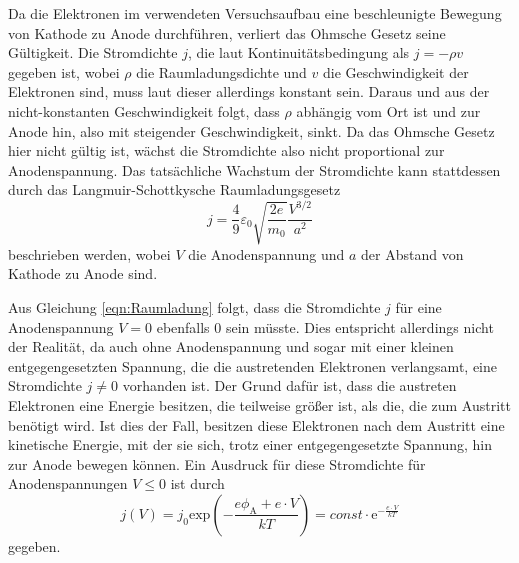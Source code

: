 
Da die Elektronen im verwendeten Versuchsaufbau eine beschleunigte Bewegung von Kathode zu Anode durchführen, verliert das Ohmsche Gesetz seine Gültigkeit. Die Stromdichte $j$,
die laut Kontinuitätsbedingung als $j = - \rho v$ gegeben ist, wobei $\rho$ die Raumladungsdichte und $v$ die Geschwindigkeit der Elektronen sind, muss laut dieser allerdings
konstant sein. Daraus und aus der nicht-konstanten Geschwindigkeit folgt, dass $\rho$ abhängig vom Ort ist und zur Anode hin, also mit steigender Geschwindigkeit, sinkt.
\newline
Da das Ohmsche Gesetz hier nicht gültig ist, wächst die Stromdichte also nicht proportional zur Anodenspannung. Das tatsächliche Wachstum der Stromdichte kann stattdessen
durch das Langmuir-Schottkysche Raumladungsgesetz 
\begin{equation}
    j = \frac{4}{9}\varepsilon_0 \sqrt{\frac{2e}{m_0}}\frac{V^{3/2}}{a^2}
    \label{eqn:Raumladung}
\end{equation}
beschrieben werden, wobei $V$ die Anodenspannung und $a$ der Abstand von Kathode zu Anode sind.

Aus Gleichung \eqref{eqn:Raumladung} folgt, dass die Stromdichte $j$ für eine Anodenspannung $V = 0$ ebenfalls 0 sein müsste. Dies entspricht allerdings nicht der Realität,
da auch ohne Anodenspannung und sogar mit einer kleinen entgegengesetzten Spannung, die die austretenden Elektronen verlangsamt, eine Stromdichte $j \neq 0$ vorhanden ist.
Der Grund dafür ist, dass die austreten Elektronen eine Energie besitzen, die teilweise größer ist, als die, die zum Austritt benötigt wird. Ist dies der Fall, besitzen diese
Elektronen nach dem Austritt eine kinetische Energie, mit der sie sich, trotz einer entgegengesetzte Spannung, hin zur Anode bewegen können. Ein Ausdruck für diese
Stromdichte für Anodenspannungen $V \leq 0$ ist durch
\begin{equation}
    \label{eqn:j_Anlauf}
    j(V) = j_0 \mathrm{exp}\left(-\frac{e\phi_\text{A} + e \cdot V}{kT} \right) = const \cdot \mathrm{e}^{-\frac{e \cdot V}{kT}}
\end{equation}
gegeben.

